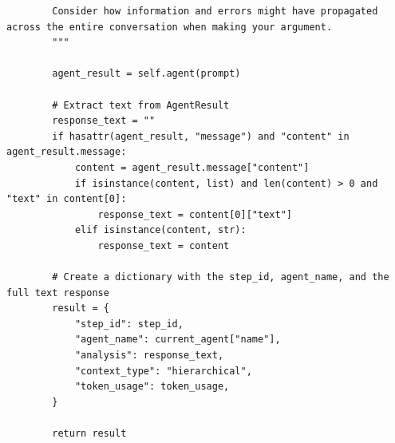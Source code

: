 \documentclass{article}
\begin{document}
\begin{lstlisting}
        Consider how information and errors might have propagated across the entire conversation when making your argument.
        """

        agent_result = self.agent(prompt)

        # Extract text from AgentResult
        response_text = ""
        if hasattr(agent_result, "message") and "content" in agent_result.message:
            content = agent_result.message["content"]
            if isinstance(content, list) and len(content) > 0 and "text" in content[0]:
                response_text = content[0]["text"]
            elif isinstance(content, str):
                response_text = content

        # Create a dictionary with the step_id, agent_name, and the full text response
        result = {
            "step_id": step_id,
            "agent_name": current_agent["name"],
            "analysis": response_text,
            "context_type": "hierarchical",
            "token_usage": token_usage,
        }

        return result

\end{lstlisting}
\end{document}
